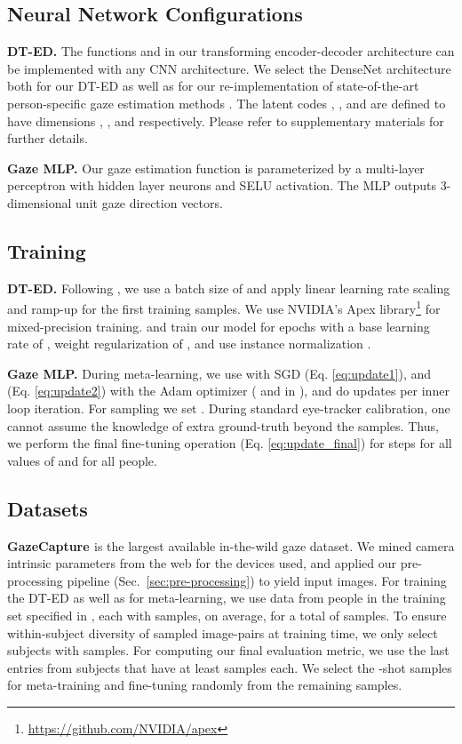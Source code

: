 \documentclass[10pt,twocolumn,letterpaper]{article}
\newcommand{\Paragraph}[1]
{\vspace{1.5mm} \noindent \textbf{#1}}
\begin{document}
\subsection{Neural Network Configurations}
\Paragraph{DT-ED.}
The functions  and  in our transforming encoder-decoder architecture can be implemented with any CNN architecture. We select the DenseNet architecture \cite{Huang2017CVPR} both for  our DT-ED as well as for our re-implementation of state-of-the-art person-specific gaze estimation methods \cite{Liu2018BMVC,Zhang2019CHI}.
The latent codes , , and  are defined to have dimensions , , and  respectively.
Please refer to supplementary materials for further details.

\Paragraph{Gaze MLP.}
Our gaze estimation function  is parameterized by a multi-layer perceptron with  hidden layer neurons and SELU \cite{Klambauer2017NeurIPS} activation.
The MLP outputs 3-dimensional unit gaze direction vectors.

\subsection{Training}
\Paragraph{DT-ED.}
Following \cite{Goyal2017arXiv}, we use a batch size of  and apply linear learning rate scaling and ramp-up for the first  training samples.
We use NVIDIA's Apex library\footnote{\url{https://github.com/NVIDIA/apex}} for mixed-precision training. 
and train our model for  epochs with a base learning rate of ,  weight regularization  of , and use instance normalization \cite{Ulyanov2016arXiv}. 

\Paragraph{Gaze MLP.}
During meta-learning, we use  with SGD (Eq. \ref{eq:update1}), and   (Eq. \ref{eq:update2}) with the Adam optimizer ( and  in \cite{Finn2017ICML}), and do  updates per inner loop iteration. For sampling  we set . 
During standard eye-tracker calibration, one cannot assume the knowledge of extra ground-truth beyond the  samples.
Thus, we perform the final fine-tuning operation (Eq. \ref{eq:update_final}) for  steps for all values of  and for all people.

\subsection{Datasets}

\Paragraph{GazeCapture \cite{Krafka2016CVPR}} is the largest available in-the-wild gaze dataset. We mined camera intrinsic parameters from the web for the devices used, and applied our pre-processing pipeline (Sec.~\ref{sec:pre-processing}) to yield input images.
For training the DT-ED as well as for meta-learning, we use data from  people in the training set specified in \cite{Krafka2016CVPR}, each with  samples, on average, for a total of  samples. 
To ensure within-subject diversity of sampled image-pairs at training time, we only select subjects with  samples.
For computing our final evaluation metric, we use the last  entries from  subjects that have at least  samples each. We select the -shot samples for meta-training and fine-tuning randomly from the remaining samples.
\end{document}
